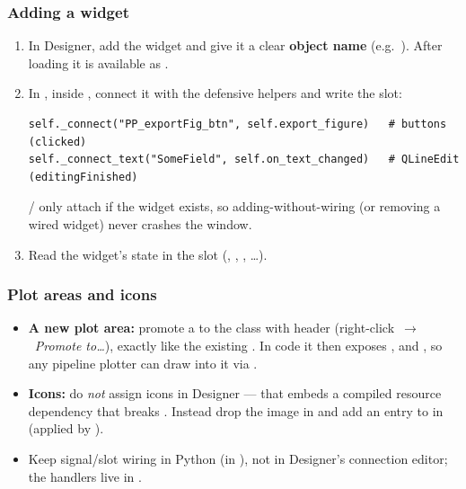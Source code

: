 \subsubsection{Adding a widget}
\begin{enumerate}
  \item In Designer, add the widget and give it a clear \textbf{object name}
        (e.g.\ ). After loading it is available as
        .
  \item In , inside , connect it with the
        defensive helpers and write the slot:
\begin{lstlisting}
self._connect("PP_exportFig_btn", self.export_figure)   # buttons (clicked)
self._connect_text("SomeField", self.on_text_changed)   # QLineEdit (editingFinished)
\end{lstlisting}
        / only attach if the widget
        exists, so adding-without-wiring (or removing a wired widget) never
        crashes the window.
  \item Read the widget's state in the slot (,
        , , \dots).
\end{enumerate}

\subsubsection{Plot areas and icons}
\begin{itemize}
  \item \textbf{A new plot area:} promote a  to the class
         with header 
        (right-click~$\to$~\emph{Promote to\dots}), exactly like the existing
        . In code it then exposes ,  and
        , so any pipeline plotter can draw into it via
        .
  \item \textbf{Icons:} do \emph{not} assign icons in Designer --- that embeds a
        compiled  resource dependency that breaks .
        Instead drop the image in  and add an entry to
         in  (applied by
        ).
  \item Keep signal/slot wiring in Python (in ), not in Designer's
        connection editor; the handlers live in .
\end{itemize}

